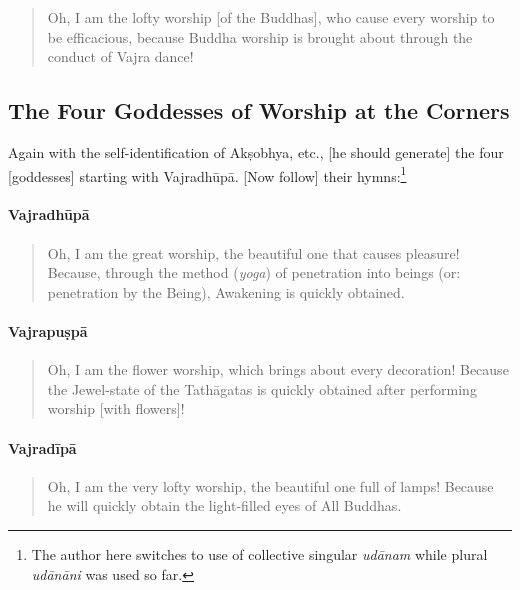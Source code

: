 \documentclass[11pt]{book}
\newcommand{\skt}[1]{\emph{#1}}
\begin{document}
\begin{verse}
Oh, I am the lofty worship [of the Buddhas], who cause every worship to be efficacious, because Buddha worship is brought about through the conduct of Vajra dance!\\
\end{verse}

\subsection{The Four Goddesses of Worship at the Corners}

Again with the self-identification of Akṣobhya, etc., [he should generate] the four [goddesses] starting with Vajradhūpā. [Now follow] their hymns:\footnote{The author here switches to use of collective singular \skt{udānam} while plural \skt{udānāni} was used so far.}

\paragraph{Vajradhūpā}

\begin{verse}
Oh, I am the great worship, the beautiful one that causes pleasure! Because, through the method (\emph{yoga}) of penetration into beings (or: penetration by the Being), Awakening is quickly obtained.
\end{verse}

\paragraph{Vajrapuṣpā}

\begin{verse}
Oh, I am the flower worship, which brings about every decoration! Because the Jewel-state of the Tathāgatas is quickly obtained after performing worship [with flowers]!

\end{verse}

\paragraph{Vajradīpā}

\begin{verse}
Oh, I am the very lofty worship, the beautiful one full of lamps! Because he will quickly obtain the light-filled eyes of All Buddhas.
\end{verse}
\end{document}
